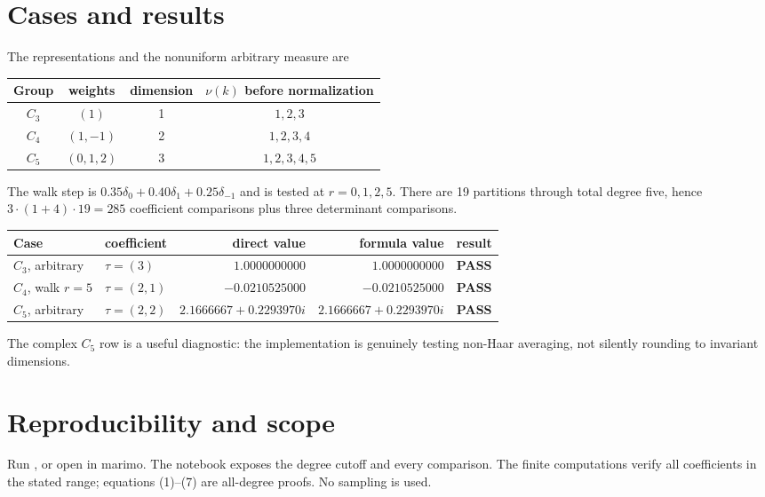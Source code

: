 \documentclass[10pt]{article}
\newcommand{\PASS}{\textcolor{passgreen}{\textbf{PASS}}}
\begin{document}
\section{Cases and results}
The representations and the nonuniform arbitrary measure are
\begin{center}
\begin{tabular}{@{}cccc@{}}
\toprule
Group & weights & dimension & $\nu(k)$ before normalization\\
\midrule
$C_3$ & $(1)$ & 1 & $1,2,3$\\
$C_4$ & $(1,-1)$ & 2 & $1,2,3,4$\\
$C_5$ & $(0,1,2)$ & 3 & $1,2,3,4,5$\\
\bottomrule
\end{tabular}
\end{center}
The walk step is $0.35\delta_0+0.40\delta_1+0.25\delta_{-1}$ and is tested
at $r=0,1,2,5$.  There are 19 partitions through total degree five, hence
$3\cdot(1+4)\cdot19=285$ coefficient comparisons plus three determinant
comparisons.

\begin{center}
\begin{tabularx}{\linewidth}{@{}lXrrc@{}}
\toprule
Case & coefficient & direct value & formula value & result\\
\midrule
$C_3$, arbitrary & $\tau=(3)$ & $1.0000000000$ & $1.0000000000$ & \PASS\\
$C_4$, walk $r=5$ & $\tau=(2,1)$ & $-0.0210525000$ & $-0.0210525000$ & \PASS\\
$C_5$, arbitrary & $\tau=(2,2)$ & $2.1666667+0.2293970i$ & $2.1666667+0.2293970i$ & \PASS\\
\bottomrule
\end{tabularx}
\end{center}
The complex $C_5$ row is a useful diagnostic: the implementation is genuinely
testing non-Haar averaging, not silently rounding to invariant dimensions.

\section{Reproducibility and scope}
Run , or open
 in marimo.  The notebook exposes the
degree cutoff and every comparison.  The finite computations verify all
coefficients in the stated range; equations (1)--(7) are all-degree proofs.
No sampling is used.
\end{document}
